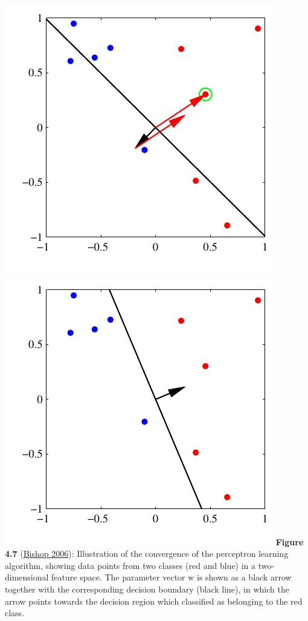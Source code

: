 \documentclass[ignorenonframetext,plain]{beamer}
\begin{document}
\begin{frame}
\begin{columns}
\includegraphics[height=.4\textheight]{images/bishop-fig-4-7c.pdf}
\includegraphics[height=.4\textheight]{images/bishop-fig-4-7d.pdf}
\footnotesize {\bf Figure 4.7}
(\href{http://research.microsoft.com/en-us/um/people/cmbishop/prml}
       {Bishop 2006}): 
Illustration of the convergence of the perceptron learning algorithm,
showing data points from two classes (red and blue) in a
two-dimensional feature space. The parameter vector w is shown as a
black arrow together with the corresponding decision boundary (black
line), in which the arrow points towards the decision region which
classified as belonging to the red class.
\end{columns}
\end{frame}
\end{document}

